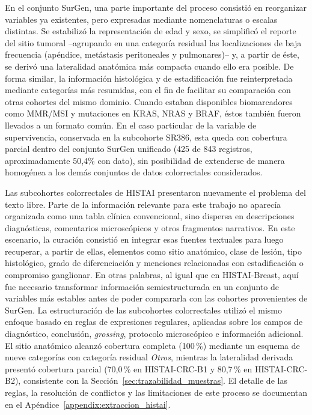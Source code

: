En el conjunto SurGen, una parte importante del proceso consistió en reorganizar variables ya existentes, pero expresadas mediante nomenclaturas o escalas distintas. Se estabilizó la representación de edad y sexo, se simplificó el reporte del sitio tumoral --agrupando en una categoría residual las localizaciones de baja frecuencia (apéndice, metástasis peritoneales y pulmonares)-- y, a partir de éste, se derivó una lateralidad anatómica más compacta cuando ello era posible. De forma similar, la información histológica y de estadificación fue reinterpretada mediante categorías más resumidas, con el fin de facilitar su comparación con otras cohortes del mismo dominio. Cuando estaban disponibles biomarcadores como MMR/MSI y mutaciones en KRAS, NRAS y BRAF, éstos también fueron llevados a un formato común. En el caso particular de la variable de supervivencia, conservada en la subcohorte SR386, esta queda con cobertura parcial dentro del conjunto SurGen unificado (425 de 843 registros, aproximadamente 50,4\% con dato), sin posibilidad de extenderse de manera homogénea a los demás conjuntos de datos colorrectales considerados.

Las subcohortes colorrectales de HISTAI presentaron nuevamente el problema del texto libre. Parte de la información relevante para este trabajo no aparecía organizada como una tabla clínica convencional, sino dispersa en descripciones diagnósticas, comentarios microscópicos y otros fragmentos narrativos. En este escenario, la curación consistió en integrar esas fuentes textuales para luego recuperar, a partir de ellas, elementos como sitio anatómico, clase de lesión, tipo histológico, grado de diferenciación y menciones relacionadas con estadificación o compromiso ganglionar. En otras palabras, al igual que en HISTAI-Breast, aquí fue necesario transformar información semiestructurada en un conjunto de variables más estables antes de poder compararla con las cohortes provenientes de SurGen. La estructuración de las subcohortes colorrectales utilizó el mismo enfoque basado en reglas de expresiones regulares, aplicadas sobre los campos de diagnóstico, conclusión, \textit{grossing}, protocolo microscópico e información adicional. El sitio anatómico alcanzó cobertura completa (100\,\%) mediante un esquema de nueve categorías con categoría residual \textit{Otros}, mientras la lateralidad derivada presentó cobertura parcial (70,0\,\% en HISTAI-CRC-B1 y 80,7\,\% en HISTAI-CRC-B2), consistente con la Sección~\ref{sec:trazabilidad_muestras}. El detalle de las reglas, la resolución de conflictos y las limitaciones de este proceso se documentan en el Apéndice~\ref{appendix:extraccion_histai}.

